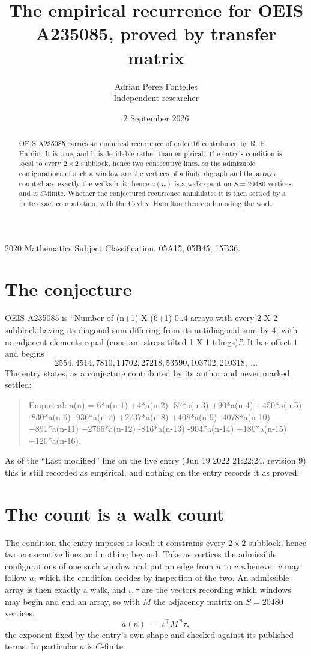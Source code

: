 \documentclass[11pt,a4paper]{article}
\title{The empirical recurrence for OEIS A235085, proved by transfer matrix}
\author{Adrian Perez Fontelles\\ \small Independent researcher}
\date{2 September 2026}
\theoremstyle{plain}
\theoremstyle{definition}
\begin{document}
\maketitle

\begin{abstract}
OEIS A235085 carries an empirical recurrence of order $16$ contributed by R. H. Hardin. It is
true, and it is decidable rather than empirical. The entry's condition is local to every $2\times2$ subblock, hence two consecutive lines, so
the admissible configurations of such a window are the vertices of a finite digraph and the
arrays counted are exactly the walks in it; hence $a(n)$ is a walk count on $S=20480$ vertices
and is $C$-finite. Whether the conjectured recurrence annihilates it is then settled by a
finite exact computation, with the Cayley--Hamilton theorem bounding the work.
\end{abstract}

\noindent\small 2020 Mathematics Subject Classification. 05A15, 05B45, 15B36.\normalsize

\section{The conjecture}

OEIS A235085 is ``Number of (n+1) X (6+1) 0..4 arrays with every 2 X 2 subblock having its diagonal sum differing from its antidiagonal sum by 4, with no adjacent elements equal (constant-stress tilted 1 X 1 tilings).''. It has offset $1$ and begins
\[
2554, 4514, 7810, 14702, 27218, 53590, 103702, 210318,\ \dots
\]
The entry states, as a conjecture contributed by its author and never marked settled:
\begin{quote}
Empirical: a(n) = 6*a(n-1) +4*a(n-2) -87*a(n-3) +90*a(n-4) +450*a(n-5) -830*a(n-6) -936*a(n-7) +2737*a(n-8) +408*a(n-9) -4078*a(n-10) +891*a(n-11) +2766*a(n-12) -816*a(n-13) -904*a(n-14) +180*a(n-15) +120*a(n-16).
\end{quote}
As of the ``Last modified'' line on the live entry (Jun 19 2022 21:22:24, revision 9) this is still
recorded as empirical, and nothing on the entry records it as proved.

\section{The count is a walk count}

The condition the entry imposes is local: it constrains every $2\times2$ subblock, hence two consecutive lines and nothing beyond. Take as vertices the admissible configurations of one such window and put an edge from $u$ to $v$ whenever $v$ may follow $u$, which the condition decides by inspection of the two.
An admissible array is then exactly a walk, and $\iota,\tau$ are the vectors recording which windows may begin and end an array, so with $M$ the adjacency matrix on $S=20480$ vertices,
\[
a(n)\;=\;\iota^{\!\top}M^{\,n}\tau ,
\]
the exponent fixed by the entry's own shape and checked against its published terms. In
particular $a$ is $C$-finite.
\end{document}

